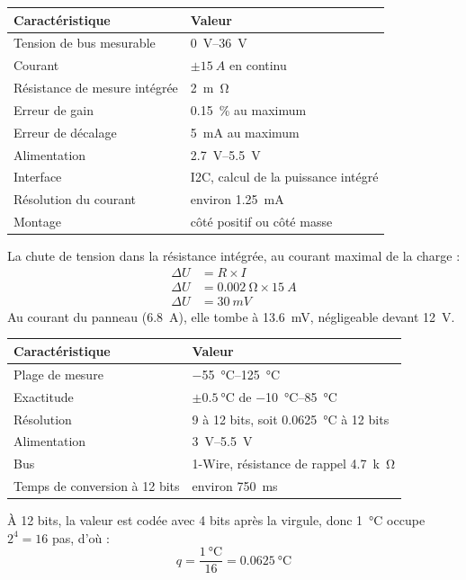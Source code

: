 \noindent
\begin{table}[H]
\centering
\begin{tabularx}{\linewidth}{lY}
\hline
Caractéristique & Valeur \\
\hline
Tension de bus mesurable & \qtyrange{0}{36}{V} \\
Courant & $\pm\qty{15}{A}$ en continu \\
Résistance de mesure intégrée & \qty{2}{m\ohm} \\
Erreur de gain & \qty{0,15}{\percent} au maximum \\
Erreur de décalage & \qty{5}{mA} au maximum \\
Alimentation & \qtyrange{2,7}{5,5}{V} \\
Interface & I2C, calcul de la puissance intégré \\
Résolution du courant & environ \qty{1,25}{mA} \\
Montage & côté positif ou côté masse \\
\hline
\end{tabularx}
\end{table}
La chute de tension dans la résistance intégrée, au courant maximal de la charge :
\begin{align*}
\Delta U &= R \times I\\
\Delta U &= \qty{0,002}{\ohm} \times \qty{15}{A}\\
\Delta U &= \qty{30}{mV}
\end{align*}
Au courant du panneau (\qty{6,8}{A}), elle tombe à \qty{13,6}{mV}, négligeable devant \qty{12}{V}.

\noindent
\begin{table}[H]
\centering
\begin{tabularx}{\linewidth}{lY}
\hline
Caractéristique & Valeur \\
\hline
Plage de mesure & \qtyrange{-55}{125}{\celsius} \\
Exactitude & $\pm\qty{0,5}{\celsius}$ de \qtyrange{-10}{85}{\celsius} \\
Résolution & 9 à 12 bits, soit \qty{0,0625}{\celsius} à 12 bits \\
Alimentation & \qtyrange{3}{5,5}{V} \\
Bus & 1-Wire, résistance de rappel \qty{4,7}{k\ohm} \\
Temps de conversion à 12 bits & environ \qty{750}{ms} \\
\hline
\end{tabularx}
\end{table}
À 12 bits, la valeur est codée avec 4 bits après la virgule, donc \qty{1}{\celsius} occupe $2^4 = 16$ pas, d'où :
\[
q = \frac{\qty{1}{\celsius}}{16} = \qty{0,0625}{\celsius}
\]

